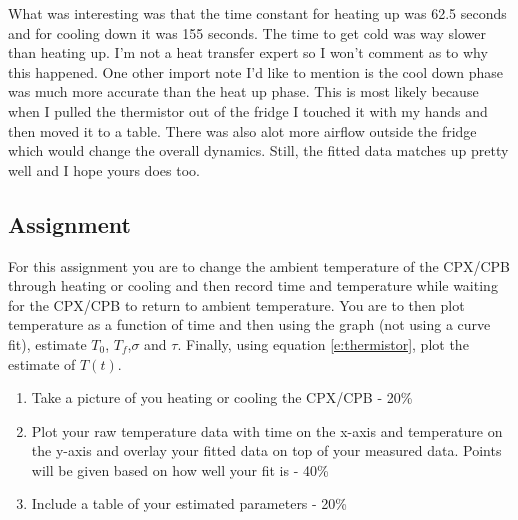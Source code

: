 What was interesting was that the time constant for heating up was 62.5 seconds and for cooling down it was 155 seconds. The time to get cold was way slower than heating up. I’m not a heat transfer expert so I won’t comment as to why this happened. One other import note I’d like to mention is the cool down phase was much more accurate than the heat up phase. This is most likely because when I pulled the thermistor out of the fridge I touched it with my hands and then moved it to a table. There was also alot more airflow outside the fridge which would change the overall dynamics. Still, the fitted data matches up pretty well and I hope yours does too.

\subsection{Assignment}

For this assignment you are to change the ambient temperature of the CPX/CPB through heating or cooling and then record time and temperature while waiting for the CPX/CPB to return to ambient temperature. You are to then plot temperature as a function of time and then using the graph (not using a curve fit), estimate $T_0$, $T_f$,$\sigma$ and $\tau$. Finally, using equation \ref{e:thermistor}, plot the estimate of $T(t)$.



\begin{enumerate}[itemsep=-5pt]
\item Take a picture of you heating or cooling the CPX/CPB - 20\%
\item Plot your raw temperature data with time on the x-axis and temperature on the y-axis and overlay your fitted data on top of your measured data. Points will be given based on how well your fit is - 40\%
\item Include a table of your estimated parameters - 20\%
\end{enumerate}
